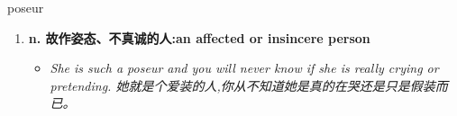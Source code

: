 
\begin{frame}
{\huge poseur}
\begin{center}
\begin{enumerate}\Large
  \item \textbf{n. 故作姿态、不真诚的人:an affected or insincere person}
  \begin{itemize}
    \item \em{\Large{She is such a poseur and you will never know if she is really crying or pretending. 她就是个爱装的人,你从不知道她是真的在哭还是只是假装而已。}}
  \end{itemize}
\end{enumerate}
\end{center}
\end{frame}
